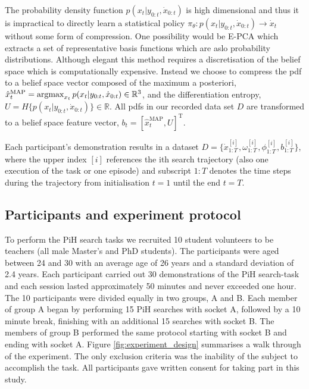 The probability density function $p(x_t|y_{0:t},\dot{x}_{0:t})$ is high dimensional and thus it is 
impractical to directly learn a statistical policy $\pi_{\theta} : p(x_t|y_{0:t},\dot{x}_{0:t}) \rightarrow \dot{x}_t$
without some form of compression. One possibility would be E-PCA \cite{NIPS2002_2319} which extracts a set of 
representative basis functions which are aslo probability distributions. Although elegant this method 
requires a discretisation of the belief space which is computationally expensive. Instead we choose to 
compress the pdf to a belief space vector composed of the maximum a posteriori, $\hat{x}^{\mathrm{MAP}}_t = \argmax_{x_t} p(x_t|y_{0:t},\dot{x}_{0:t}) \in \mathbb{R}^3$, and the differentiation entropy, 
$U = H\{p(x_t|y_{0:t},\dot{x}_{0:t})\} \in \mathbb{R}$. All pdfs in our recorded data set $D$ are transformed to 
a belief space feature vector, $b_t = [\hat{x}^{\mathrm{MAP}}_t,U]^{\mathrm{T}}$. 

Each participant's demonstration results in a dataset $D=\{\dot{x}^{[i]}_{1:T},\omega^{[i]}_{1:T},\phi^{[i]}_{1:T},b^{[i]}_{1:T}\}$, 
where the upper index $[i]$ references the ith search trajectory (also one execution of the task or one episode) and 
subscript $1:T$ denotes the time steps during the trajectory from initialisation $t=1$ until the end $t=T$. 

\subsection{Participants and experiment protocol}

To perform the PiH search tasks we recruited 10 student volunteers to be teachers (all male Master's and PhD students).
The participants were aged between 24 and 30 with an average age of 26 years and a standard deviation of 2.4 years.
Each participant carried out 30 demonstrations of the PiH search-task and each session lasted approximately 50 minutes and 
never exceeded one hour. The 10 participants were divided equally in two groups, A and B. Each member of group A began 
by performing 15 PiH searches with socket A, followed by a 10 minute break, finishing with an additional 15 searches with socket B. 
The members of group B performed the same protocol starting with socket B and ending with socket A.
Figure \ref{fig:experiment_design} summarises a walk through of the experiment.
The only exclusion criteria was the inability of the subject to accomplish the task. All participants gave written consent 
for taking part in this study.


